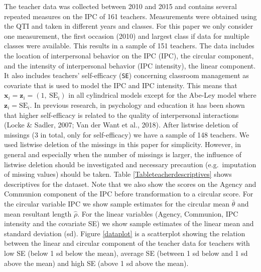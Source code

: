 \documentclass[man,mask]{apa6}
\DeclareRobustCommand{\VANDER}[3]{#2}
\begin{document}
The teacher data was collected between 2010 and 2015 and contains several
repeated measures on the IPC of 161 teachers. Measurements were obtained using
the QTI and taken in different years and classes. For this paper we only
consider one measurement, the first occasion (2010) and largest class if data
for multiple classes were available. This results in a sample of 151 teachers.
The data includes the location of interpersonal behavior on the IPC (IPC), the
circular component, and the intensity of interpersonal behavior (IPC intensity),
the linear component. It also includes teachers' self-efficacy (\verb|SE|)
concerning classroom management as covariate that is used to model the IPC and
IPC intensity. This means that \(\boldsymbol{x}_i = \boldsymbol{z}_i = (1,\: \text{SE}_i)\) in all cylindrical models except for the Abe-Ley model where
\(\boldsymbol{z}_i = \text{SE}_i\). In previous research, in psychology and
education it has been shown that higher self-efficacy is related to the quality
of interpersonal interactions (Locke \& Sadler, 2007; \VANDER{Want}{Van der}{van der} Want et al., 2018).
After listwise deletion of missings (\(3\) in total, only for self-efficacy) we
have a sample of 148 teachers. We used listwise deletion of the missings in this
paper for simplicity. However, in general and especially when the number of
missings is larger, the influence of listwise deletion should be investigated
and necessary precaution (e.g.~imputation of missing values) should be taken.
Table \ref{Tableteacherdescriptives} shows descriptives for the dataset. Note
that we also show the scores on the Agency and Communion component of the IPC
before transformation to a circular score. For the circular variable IPC we show
sample estimates for the circular mean \(\bar{\theta}\) and mean resultant length
\(\hat{\rho}\). For the linear variables (Agency, Communion, IPC intensity and the
covariate SE) we show sample estimates of the linear mean and standard deviation
(sd). Figure \ref{dataplot} is a scatterplot showing the relation between the
linear and circular component of the teacher data for teachers with low SE
(below 1 sd below the mean), average SE (between 1 sd below and 1 sd above the
mean) and high SE (above 1 sd above the mean).
\end{document}
